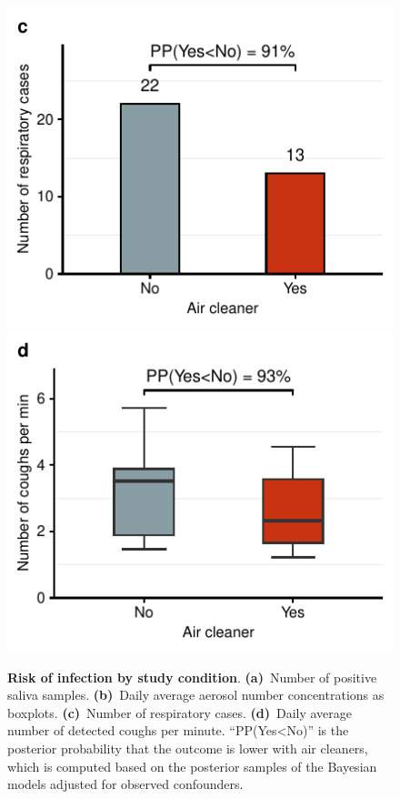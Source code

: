 \documentclass[fleqn,11pt]{wlscirep}
\begin{document}
\begin{figure}[!htpb]
    \includegraphics{../../results/epi-data/cases_by_condition.pdf}\hspace{.5cm}
    \includegraphics{../../results/cough-data/coughs-frequency-by-condition.pdf}
    \caption{\textbf{Risk of infection by study condition}. \textbf{(a)}~Number of positive saliva samples. \textbf{(b)}~Daily average aerosol number concentrations as boxplots. \textbf{(c)}~Number of respiratory cases. \textbf{(d)}~Daily average number of detected coughs per minute. ``PP(Yes<No)'' is the posterior probability that the outcome is lower with air cleaners, which is computed based on the posterior samples of the Bayesian models adjusted for observed confounders.}
    \label{fig:infection-risk}
\end{figure}

\FloatBarrier
\end{document}
